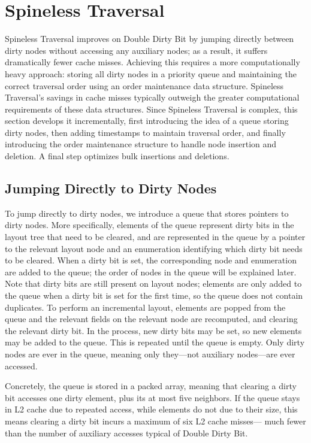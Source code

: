 \section{Spineless Traversal}

Spineless Traversal improves on Double Dirty Bit
  by jumping directly between dirty nodes
  without accessing any auxiliary nodes;
  as a result, it suffers dramatically fewer cache misses.
Achieving this requires a more computationally heavy approach:
  storing all dirty nodes in a priority queue
  and maintaining the correct traversal order
  using an order maintenance data structure.
Spineless Traversal's savings in cache misses
  typically outweigh the greater computational requirements
  of these data structures.
Since Spineless Traversal is complex,
  this section develops it incrementally,
  first introducing the idea of a queue storing dirty nodes,
  then adding timestamps to maintain traversal order,
  and finally introducing the order maintenance structure
  to handle node insertion and deletion.
A final step optimizes bulk insertions and deletions.

\subsection{Jumping Directly to Dirty Nodes}

To jump directly to dirty nodes,
  we introduce a queue
  that stores pointers to dirty nodes.
More specifically, elements of the queue represent
  dirty bits in the layout tree that need to be cleared,
  and are represented in the queue by
  a pointer to the relevant layout node
  and an enumeration identifying
  which dirty bit needs to be cleared.
When a dirty bit is set,
  the corresponding node and enumeration are added to the queue;
  the order of nodes in the queue will be explained later.
Note that dirty bits are still present on layout nodes;
  elements are only added to the queue
  when a dirty bit is set for the first time,
  so the queue does not contain duplicates.
To perform an incremental layout,
  elements are popped from the queue
  and the relevant fields on the relevant node are recomputed,
  and clearing the relevant dirty bit.
In the process, new dirty bits may be set,
  so new elements may be added to the queue.
This is repeated until the queue is empty.
Only dirty nodes are ever in the queue,
  meaning only they---not auxiliary nodes---are ever accessed.

Concretely, the queue is stored in a packed array,
  meaning that clearing a dirty bit accesses
  one dirty element,
  plus its at most five neighbors.
If the queue stays in L2 cache due to repeated access,
  while elements do not due to their size,
  this means clearing a dirty bit incurs
  a maximum of six L2 cache misses---%
  much fewer than the number of auxiliary accesses
  typical of Double Dirty Bit.

